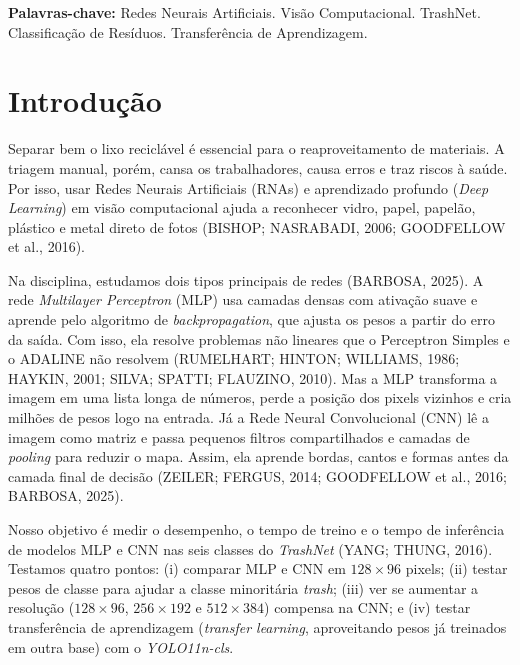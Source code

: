 \documentclass[11pt,a4paper]{article}
\begin{document}
\noindent\textbf{Palavras-chave:} Redes Neurais Artificiais. Visão Computacional. TrashNet. Classificação de Resíduos. Transferência de Aprendizagem.

\section{Introdução}

Separar bem o lixo reciclável é essencial para o reaproveitamento de materiais. A triagem manual, porém, cansa os trabalhadores, causa erros e traz riscos à saúde. Por isso, usar Redes Neurais Artificiais (RNAs) e aprendizado profundo (\textit{Deep Learning}) em visão computacional ajuda a reconhecer vidro, papel, papelão, plástico e metal direto de fotos (BISHOP; NASRABADI, 2006; GOODFELLOW et al., 2016).

Na disciplina, estudamos dois tipos principais de redes (BARBOSA, 2025). A rede \textit{Multilayer Perceptron} (MLP) usa camadas densas com ativação suave e aprende pelo algoritmo de \textit{backpropagation}, que ajusta os pesos a partir do erro da saída. Com isso, ela resolve problemas não lineares que o Perceptron Simples e o ADALINE não resolvem (RUMELHART; HINTON; WILLIAMS, 1986; HAYKIN, 2001; SILVA; SPATTI; FLAUZINO, 2010). Mas a MLP transforma a imagem em uma lista longa de números, perde a posição dos pixels vizinhos e cria milhões de pesos logo na entrada. Já a Rede Neural Convolucional (CNN) lê a imagem como matriz e passa pequenos filtros compartilhados e camadas de \textit{pooling} para reduzir o mapa. Assim, ela aprende bordas, cantos e formas antes da camada final de decisão (ZEILER; FERGUS, 2014; GOODFELLOW et al., 2016; BARBOSA, 2025).

Nosso objetivo é medir o desempenho, o tempo de treino e o tempo de inferência de modelos MLP e CNN nas seis classes do \textit{TrashNet} (YANG; THUNG, 2016). Testamos quatro pontos: (i) comparar MLP e CNN em $128 \times 96$ pixels; (ii) testar pesos de classe para ajudar a classe minoritária \textit{trash}; (iii) ver se aumentar a resolução ($128 \times 96$, $256 \times 192$ e $512 \times 384$) compensa na CNN; e (iv) testar transferência de aprendizagem (\textit{transfer learning}, aproveitando pesos já treinados em outra base) com o \textit{YOLO11n-cls}.

\end{document}
